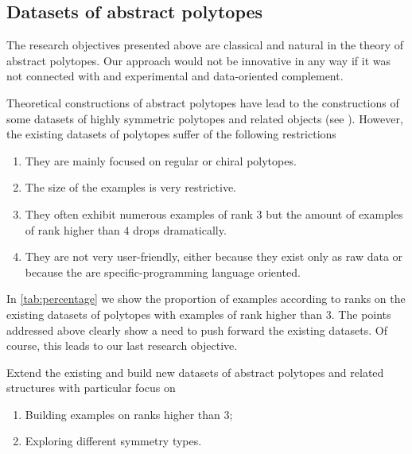 \subsection*{Datasets of abstract polytopes} \label{sec:datasets}

The research objectives presented above are classical and natural in the theory of abstract polytopes. 
Our approach would not be innovative in any way if it was not connected with and experimental and data-oriented complement.


Theoretical constructions of abstract polytopes have lead to the constructions of some datasets of highly symmetric polytopes and related objects (see \cite{Conder2013_ChiralRotaryMaps,Conder2012_RegularNonOrientable,Conder2012_RotaryMapsOn,Conder2012_RegularPolytopes2000,Conder2011_RegularOrientableMaps,Conder2006_ChiralOrientablyRegular,Potocnik2014_CensusChiralMaps,Potocnik2014_CensusChiralMaps,LeLaCoMiMu_AtlasPolytopesSmall,HartHubLee_AtlasChiralPolytopes,Hartley2006_AtlasSmallChiral,Hartley2006_AtlasSmallRegular}).
However, the existing datasets of polytopes suffer of the following restrictions
\begin{enumerate}[label=\textit{(\roman*)}, noitemsep]
  \item They are mainly focused on regular or chiral polytopes.
  \item The size of the examples is very restrictive.
  \item They often exhibit numerous examples of rank $3$ but the amount of examples of rank higher than $4$ drops dramatically.
  \item They are not very user-friendly, either because they exist only as raw data or because the are specific-programming language oriented.
\end{enumerate}

In  \cref{tab:percentage} we show the proportion of examples according to ranks on the existing datasets of polytopes with examples of rank higher than $3$.
The points addressed above clearly show a need to push forward the existing datasets. 
Of course, this leads to our last research objective.

\begin{obj}\label{obj:datasets}
  Extend the existing and build new datasets of abstract polytopes and related structures with particular focus on
  \begin{enumerate}[label=\textit{(\roman*)}, noitemsep]
    \item Building examples on ranks higher than $3$;
    \item Exploring different symmetry types.
  \end{enumerate}
\end{obj}

